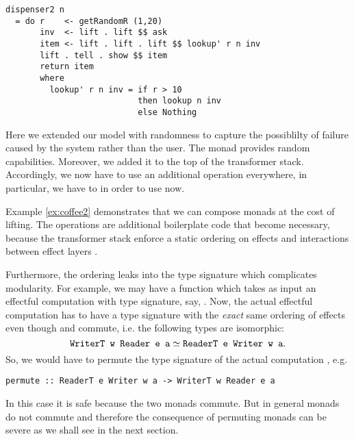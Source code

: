 \begin{example}
\begin{lstlisting}[style={haskell}]
dispenser2 n 
  = do r    <- getRandomR (1,20)
       inv  <- lift . lift $$ ask
       item <- lift . lift . lift $$ lookup' r n inv
       lift . tell . show $$ item
       return item
       where     
         lookup' r n inv = if r > 10 
                           then lookup n inv 
                           else Nothing
\end{lstlisting}
Here we extended our model with randomness to capture the possiblilty of failure caused by the system rather than the user. The  monad provides random capabilities. Moreover, we added it to the top of the transformer stack. Accordingly, we now have to use an additional  operation everywhere, in particular, we have to  in order to use  now.
\end{example}
Example \ref{ex:coffee2} demonstrates that we can compose monads at the cost of lifting. The  operations are additional boilerplate code that become necessary, because the transformer stack enforce a static ordering on effects and interactions between effect layers \cite{Kiselyov2013}.

Furthermore, the ordering leaks into the type signature which complicates modularity. For example, we may have a function which takes as input an effectful computation with type signature, say, .
Now, the actual effectful computation has to have a type signature with the \emph{exact} same ordering of effects even though  and  commute, i.e. the following types are isomorphic:
\[ \texttt{WriterT w Reader e a} \simeq \texttt{ReaderT e Writer w a}. \]
So, we would have to permute the type signature of the actual computation \cite{Brady2013}, e.g.
\begin{lstlisting}[style=haskell]
permute :: ReaderT e Writer w a -> WriterT w Reader e a
\end{lstlisting}
In this case it is safe because the two monads commute. But in general monads do not commute and therefore the consequence of permuting monads can be severe as we shall see in the next section.


